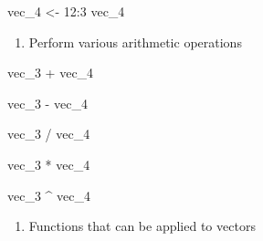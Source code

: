 \documentclass[
  letterpaper,
  DIV=11,
  numbers=noendperiod]{scrreprt}
\newenvironment{Shaded}{}{}
\newcommand{\DecValTok}[1]{\textcolor[rgb]{0.00,0.36,0.77}{#1}}
\newcommand{\NormalTok}[1]{\textcolor[rgb]{0.14,0.16,0.18}{#1}}
\newcommand{\OtherTok}[1]{\textcolor[rgb]{0.44,0.26,0.76}{#1}}
\newcommand{\SpecialCharTok}[1]{\textcolor[rgb]{0.00,0.36,0.77}{#1}}
\providecommand{\tightlist}{%
  \setlength{\itemsep}{0pt}\setlength{\parskip}{0pt}}\usepackage{longtable,booktabs,array}
\begin{document}
\begin{Shaded}
\begin{Highlighting}[]
\NormalTok{vec\_4 }\OtherTok{\textless{}{-}} \DecValTok{12}\SpecialCharTok{:}\DecValTok{3}
\NormalTok{vec\_4}
\end{Highlighting}
\end{Shaded}

\begin{enumerate}
\def\labelenumi{\alph{enumi}.}
\setcounter{enumi}{1}
\tightlist
\item
  Perform various arithmetic operations
\end{enumerate}

\begin{Shaded}
\begin{Highlighting}[]
\NormalTok{vec\_3 }\SpecialCharTok{+}\NormalTok{ vec\_4}
\end{Highlighting}
\end{Shaded}

\begin{Shaded}
\begin{Highlighting}[]
\NormalTok{vec\_3 }\SpecialCharTok{{-}}\NormalTok{ vec\_4}
\end{Highlighting}
\end{Shaded}

\begin{Shaded}
\begin{Highlighting}[]
\NormalTok{vec\_3 }\SpecialCharTok{/}\NormalTok{ vec\_4}
\end{Highlighting}
\end{Shaded}

\begin{Shaded}
\begin{Highlighting}[]
\NormalTok{vec\_3 }\SpecialCharTok{*}\NormalTok{ vec\_4}
\end{Highlighting}
\end{Shaded}

\begin{Shaded}
\begin{Highlighting}[]
\NormalTok{vec\_3 }\SpecialCharTok{\^{}}\NormalTok{ vec\_4}
\end{Highlighting}
\end{Shaded}

\begin{enumerate}
\def\labelenumi{\arabic{enumi}.}
\setcounter{enumi}{2}
\tightlist
\item
  Functions that can be applied to vectors
\end{enumerate}
\end{document}
